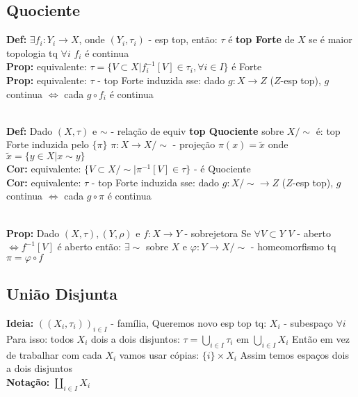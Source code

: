 \documentclass{article}
\begin{document}
\begin{landscape}
\begin{multicols}{3}
\subsection{Quociente}

\textbf{Def:} $\exists f_i:Y_i\to X$, onde $(Y_i,\tau_i)$ - esp top, então: 
$\tau$ é \textbf{top Forte} de $X$ se é maior topologia tq $\forall i$ $f_i$ é continua\\
\textbf{Prop:} equivalente: $\tau=\{V\subset X|f_i^{-1}[V]\in \tau_i,\forall i\in I\}$ é Forte\\
\textbf{Prop:} equivalente: $\tau$ - top Forte induzida sse: 
dado $g:X\to Z$ ($Z$-esp top), $g$ continua $\Leftrightarrow$ cada $g\circ f_i$ é continua\\
\\
\textbf{Def:} Dado $(X,\tau)$ e $\sim$ - relação de equiv
\textbf{top Quociente} sobre $X/\sim$ é:
top Forte induzida pelo $\{\pi\}$ $\pi:X\to X/\sim$ - projeção $\pi(x)=\tilde{x}$ onde $\tilde{x}=\{y\in X|x\sim y\}$\\
\textbf{Cor:} equivalente: $\{V\subset X/\sim| \pi^{-1}[V]\in \tau\}$ - é Quociente\\
\textbf{Cor:} equivalente: $\tau$ - top Forte induzida sse:
dado $g:X/\sim\to Z$ ($Z$-esp top), $g$ continua $\Leftrightarrow$ cada $g\circ \pi$ é continua\\
\\
\textbf{Prop:} Dado $(X,\tau),(Y,\rho)$ e $f:X\to Y$ - sobrejetora 
Se $\forall V\subset Y$ $V$ - aberto $\Leftrightarrow f^{-1}[V]$ é aberto então: 
$\exists \sim$ sobre $X$ e $\varphi:Y\to X/\sim$ - homeomorfismo tq $\pi=\varphi\circ f$\\
\subsection{União Disjunta}
\textbf{Ideia:} $((X_i,\tau_i))_{i\in I}$ - família,
Queremos novo esp top tq: $X_i$ - subespaço $\forall i$ 
Para isso: todos $X_i$ dois a dois disjuntos: $\tau = \bigcup_{i\in I}\tau_i$ em $\bigcup_{i\in I} X_i$ 
Então em vez de trabalhar com cada $X_i$ vamos usar cópias: $\{i\}\times X_i$ 
Assim temos espaços dois a dois disjuntos\\
\textbf{Notação:} $\coprod_{i\in I}X_i$
\end{multicols}
\begin{center}

\end{center}
\end{landscape}
\end{document}
